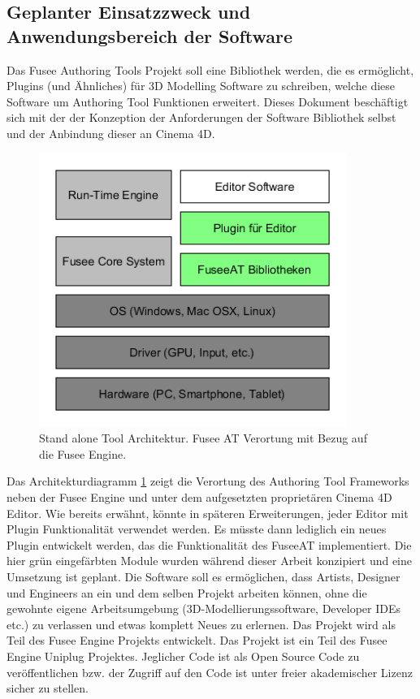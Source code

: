 \documentclass[pagesize, paper=a4, fontsize=12pt, titlepage=true, headings=small, headnosepline, abstractoff, liststotoc, nochapterprefix, plainheadsepline, twoside]{scrreprt}
\begin{document}
\subsection{Geplanter Einsatzzweck und Anwendungsbereich der Software}
Das Fusee Authoring Tools Projekt soll eine Bibliothek werden, die es ermöglicht, Plugins (und Ähnliches) für 3D Modelling Software zu schreiben, welche diese Software um Authoring Tool Funktionen erweitert. Dieses Dokument beschäftigt sich mit der der Konzeption der Anforderungen der Software Bibliothek selbst und der Anbindung dieser an Cinema 4D.

\begin{figure}[ht]
	\centering
	\includegraphics[width=10cm]{Bilder/Engine_Tool_Architektur.png}
	\caption{Stand alone Tool Architektur. Fusee AT Verortung mit Bezug auf die Fusee Engine.}
	\label{FuseeToolBezug}
\end{figure}

Das Architekturdiagramm \ref{FuseeToolBezug} zeigt die Verortung des Authoring Tool Frameworks neben der Fusee Engine und unter dem aufgesetzten proprietären Cinema 4D Editor. Wie bereits erwähnt, könnte in späteren Erweiterungen, jeder Editor mit Plugin Funktionalität verwendet werden. Es müsste dann lediglich ein neues Plugin entwickelt werden, das die Funktionalität des FuseeAT implementiert. Die hier grün eingefärbten Module wurden während dieser Arbeit konzipiert und eine Umsetzung ist geplant.
Die Software soll es ermöglichen, dass Artists, Designer und Engineers an ein und dem selben Projekt arbeiten können, ohne die gewohnte eigene Arbeitsumgebung (3D-Modellierungssoftware, Developer IDEs etc.) zu verlassen und etwas komplett Neues zu erlernen.
Das Projekt wird als Teil des Fusee Engine Projekts entwickelt. Das Projekt ist ein Teil des Fusee Engine Uniplug Projektes.
Jeglicher Code ist als Open Source Code zu veröffentlichen bzw. der Zugriff auf den Code ist unter freier akademischer Lizenz sicher zu stellen.
\end{document}

